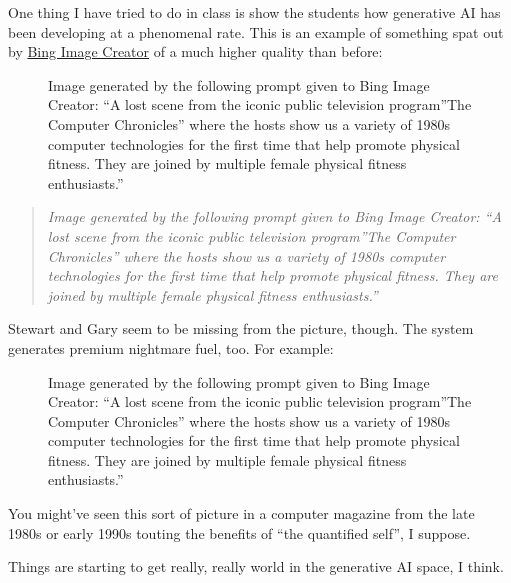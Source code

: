 One thing I have tried to do in class is show the students how
generative AI has been developing at a phenomenal rate. This is an
example of something spat out by \href{https://www.bing.com/create}{Bing
Image Creator} of a much higher quality than before:

\begin{figure}
\centering
{}
\caption{Image generated by the following prompt given to Bing Image
Creator: ``A lost scene from the iconic public television program''The
Computer Chronicles'' where the hosts show us a variety of 1980s
computer technologies for the first time that help promote physical
fitness. They are joined by multiple female physical fitness
enthusiasts.''}
\end{figure}

\begin{quote}
\emph{Image generated by the following prompt given to Bing Image
Creator: ``A lost scene from the iconic public television program''The
Computer Chronicles'' where the hosts show us a variety of 1980s
computer technologies for the first time that help promote physical
fitness. They are joined by multiple female physical fitness
enthusiasts.''}
\end{quote}

Stewart and Gary seem to be missing from the picture, though. The system
generates premium nightmare fuel, too. For example:

\begin{figure}
\centering
{}
\caption{Image generated by the following prompt given to Bing Image
Creator: ``A lost scene from the iconic public television program''The
Computer Chronicles'' where the hosts show us a variety of 1980s
computer technologies for the first time that help promote physical
fitness. They are joined by multiple female physical fitness
enthusiasts.''}
\end{figure}

You might've seen this sort of picture in a computer magazine from the
late 1980s or early 1990s touting the benefits of ``the quantified
self'', I suppose.

Things are starting to get really, really world in the generative AI
space, I think.
